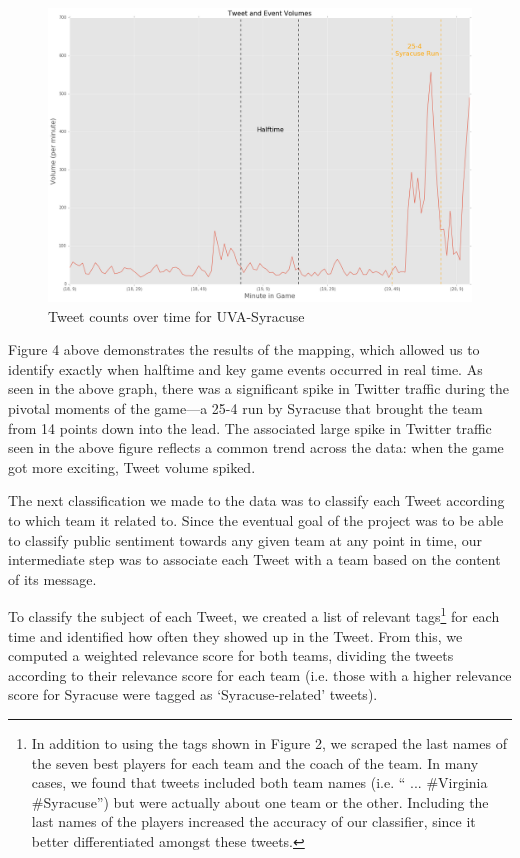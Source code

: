 \documentclass[12pt]{article}
\begin{document}
\begin{doublespacing}
\begin{figure} [H]
	\centering
	\includegraphics[scale = 0.4] {Images/Total_TweetVolume.png} 
	\caption{Tweet counts over time for UVA-Syracuse}
\end{figure}

Figure 4 above demonstrates the results of the mapping, which allowed us to identify exactly when halftime and key game events occurred in real time. As seen in the above graph, there was a significant spike in Twitter traffic during the pivotal moments of the game---a 25-4 run by Syracuse that brought the team from 14 points down into the lead. The associated large spike in Twitter traffic seen in the above figure reflects a common trend across the data: when the game got more exciting, Tweet volume spiked. 

The next classification we made to the data was to classify each Tweet according to which team it related to. Since the eventual goal of the project was to be able to classify public sentiment towards any given team at any point in time, our intermediate step was to associate each Tweet with a team based on the content of its message. 

To classify the subject of each Tweet, we created a list of relevant tags\footnote{In addition to using the tags shown in Figure 2, we scraped the last names of the seven best players for each team and the coach of the team. In many cases, we found that tweets included both team names (i.e. `` ... \#Virginia \#Syracuse'') but were actually about one team or the other. Including the last names of the players increased the accuracy of our classifier, since it better differentiated amongst these tweets.} for each time and identified how often they showed up in the Tweet. From this, we computed a weighted relevance score for both teams, dividing the tweets according to their relevance score for each team (i.e. those with a higher relevance score for Syracuse were tagged as `Syracuse-related' tweets).  


\end{doublespacing}
\end{document}
